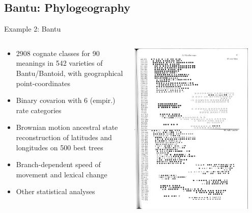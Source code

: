 \documentclass[9pt]{beamer}
\begin{document}
\subsection{Bantu: Phylogeography}
\begin{frame}{Example 2: Bantu}
  \begin{columns}
    \begin{column}{0.5\textwidth}
      \begin{itemize}
      \item 2908 cognate classes for 90 meanings in 542 varieties of Bantu/Bantoid,
        with geographical point-coordinates
      \item Binary covarion with 6 (empir.) rate categories
      \item Brownian motion ancestral state reconstruction of
        latitudes and longitudes on 500 best trees
      \item Branch-dependent speed of movement and lexical change
      \item Other statistical analyses
      \end{itemize}
    \end{column}
    \begin{column}{0.5\textwidth}
      \footnotemark\includegraphics[width=0.9\textwidth]{bantuwordlist.pdf}
    \end{column}
  \end{columns}
\end{frame}
\end{document}

